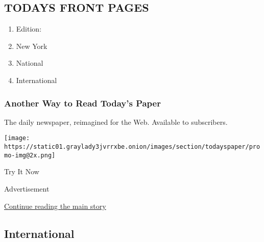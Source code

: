 \hypertarget{todays-front-pages}{%
\subsection{TODAYS FRONT PAGES}\label{todays-front-pages}}

\begin{enumerate}
\def\labelenumi{\arabic{enumi}.}
\tightlist
\item
  Edition:
\item
  New York
\item
  National
\item
  International
\end{enumerate}

\href{http://app.nytimes3xbfgragh.onion/todayspaper}{}

\hypertarget{another-way-to-read-todays-paper}{%
\subsubsection{Another Way to Read Today's
Paper}\label{another-way-to-read-todays-paper}}

The daily newspaper, reimagined for the Web. Available to subscribers.

\texttt{[image: https://static01.graylady3jvrrxbe.onion/images/section/todayspaper/promo-img@2x.png]}

Try It Now

Advertisement

\protect\hyperlink{after-mid1}{Continue reading the main story}

\hypertarget{international}{%
\subsection{International}\label{international}}

